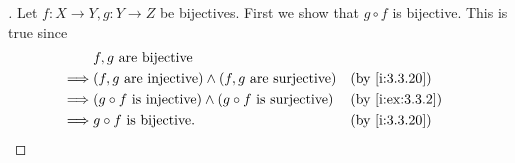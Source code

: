 \begin{proof}[]
  Let \(f : X \to Y, g : Y \to Z\) be bijectives.
  First we show that \(g \circ f\) is bijective.
  This is true since
  \begin{align*}
             & f, g \text{ are bijective}                                                                    \\
    \implies & (f, g \text{ are injective}) \land (f, g \text{ are surjective})         &  & \by{i:3.3.20}   \\
    \implies & (g \circ f \text{ is injective}) \land (g \circ f \text{ is surjective}) &  & \by{i:ex:3.3.2} \\
    \implies & g \circ f \text{ is bijective}.                                          &  & \by{i:3.3.20}
  \end{align*}


\end{proof}
